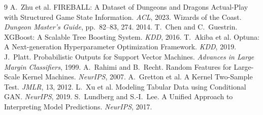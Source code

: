 \documentclass[10pt]{article}
\begin{document}
\begin{thebibliography}{9}\small
{} A.~Zhu et al. FIREBALL: A Dataset of Dungeons and Dragons
Actual-Play with Structured Game State Information. \emph{ACL}, 2023.
 Wizards of the Coast. \emph{Dungeon Master's Guide}, pp.~82--83, 274. 2014.
 T.~Chen and C.~Guestrin. XGBoost: A Scalable Tree Boosting System.
\emph{KDD}, 2016.
 T.~Akiba et al. Optuna: A Next-generation Hyperparameter
Optimization Framework. \emph{KDD}, 2019.
 J.~Platt. Probabilistic Outputs for Support Vector Machines.
\emph{Advances in Large Margin Classifiers}, 1999.
 A.~Rahimi and B.~Recht. Random Features for Large-Scale Kernel
Machines. \emph{NeurIPS}, 2007.
 A.~Gretton et al. A Kernel Two-Sample Test. \emph{JMLR}, 13, 2012.
 L.~Xu et al. Modeling Tabular Data using Conditional GAN.
\emph{NeurIPS}, 2019.
 S.~Lundberg and S.-I.~Lee. A Unified Approach to Interpreting Model
Predictions. \emph{NeurIPS}, 2017.
\end{thebibliography}
\end{document}
